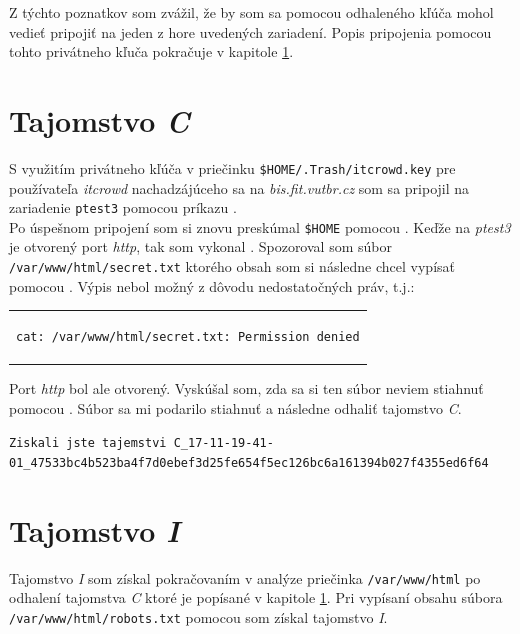 \documentclass[11pt,a4paper]{article}
\begin{document}
Z týchto poznatkov som zvážil, že by som sa pomocou odhaleného kľúča mohol vedieť pripojiť na jeden z hore uvedených zariadení. Popis pripojenia pomocou tohto privátneho kľuča pokračuje v kapitole \ref{sec:C}.

\section{Tajomstvo \textit{C}}\label{sec:C}

S využitím privátneho kľúča v priečinku \texttt{\$HOME/.Trash/itcrowd.key} pre používateľa \textit{itcrowd} nachadzájúceho sa na \textit{bis.fit.vutbr.cz} som sa pripojil na zariadenie \texttt{ptest3} pomocou príkazu .\\

Po úspešnom pripojení som si znovu preskúmal \texttt{\$HOME} pomocou . Keďže na \textit{ptest3} je otvorený port \textit{http}, tak som vykonal . Spozoroval som súbor \texttt{/var/www/html/secret.txt} ktorého obsah som si následne chcel vypísať pomocou . Výpis nebol možný z dôvodu nedostatočných práv, t.j.:

\begin{center}
\begin{tabular}{c}
\begin{lstlisting}[basicstyle=\footnotesize]
cat: /var/www/html/secret.txt: Permission denied
\end{lstlisting}
\end{tabular}
\end{center}

Port \textit{http} bol ale otvorený. Vyskúšal som, zda sa si ten súbor neviem stiahnuť pomocou . Súbor sa mi podarilo stiahnuť a následne odhaliť tajomstvo \textit{C}.

\begin{center}
\small{\texttt{Ziskali jste tajemstvi C\_17-11-19-41-01\_47533bc4b523ba4f7d0ebef3d25fe654f5ec126bc6a161394b027f4355ed6f64}}
\end{center}

\section{Tajomstvo \textit{I}}\label{sec:I}

Tajomstvo \textit{I} som získal pokračovaním v analýze priečinka \texttt{/var/www/html} po odhalení tajomstva \textit{C} ktoré je popísané v kapitole \ref{sec:C}. Pri vypísaní obsahu súbora \texttt{/var/www/html/robots.txt} pomocou  som získal tajomstvo \textit{I}.
\end{document}
